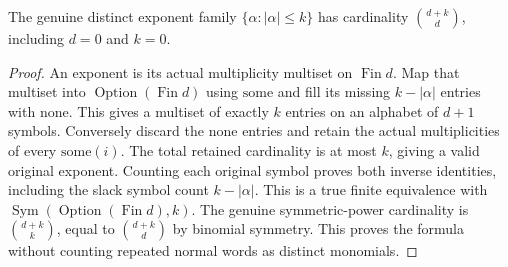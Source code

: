 \begin{lemma}
\label{hir:relative-normal-actual-base-jet-exponent-binomial-count}
\leanok
The genuine distinct exponent family $\{\alpha:|\alpha|\leq k\}$ has
cardinality $\binom{d+k}{d}$, including $d=0$ and $k=0$.
\end{lemma}
\begin{proof}
An exponent is its actual multiplicity multiset on $\operatorname{Fin}d$.
Map that multiset into $\operatorname{Option}(\operatorname{Fin}d)$ using
$\mathrm{some}$ and fill its missing $k-|\alpha|$ entries with $\mathrm{none}$.
This gives a multiset of exactly $k$ entries on an alphabet of $d+1$ symbols.
Conversely discard the $\mathrm{none}$ entries and retain the actual
multiplicities of every $\mathrm{some}(i)$. The total retained cardinality
is at most $k$, giving a valid original exponent. Counting each original
symbol proves both inverse identities, including the slack symbol count
$k-|\alpha|$. This is a true finite equivalence with
$\operatorname{Sym}(\operatorname{Option}(\operatorname{Fin}d),k)$.
The genuine symmetric-power cardinality is $\binom{d+k}{k}$, equal to
$\binom{d+k}{d}$ by binomial symmetry. This proves the formula without
counting repeated normal words as distinct monomials.
\end{proof}

